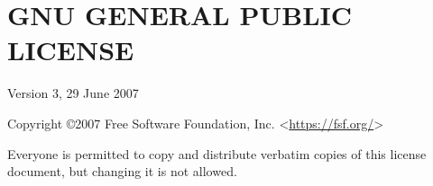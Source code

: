 \chapter{GNU GENERAL PUBLIC LICENSE}
\begin{center} Version 3, 29 June 2007 \end{center}
Copyright \copyright 2007 Free Software Foundation, Inc. <\url{https://fsf.org/}>\par
Everyone is permitted to copy and distribute verbatim copies of this license document, but changing it is not allowed.\par
